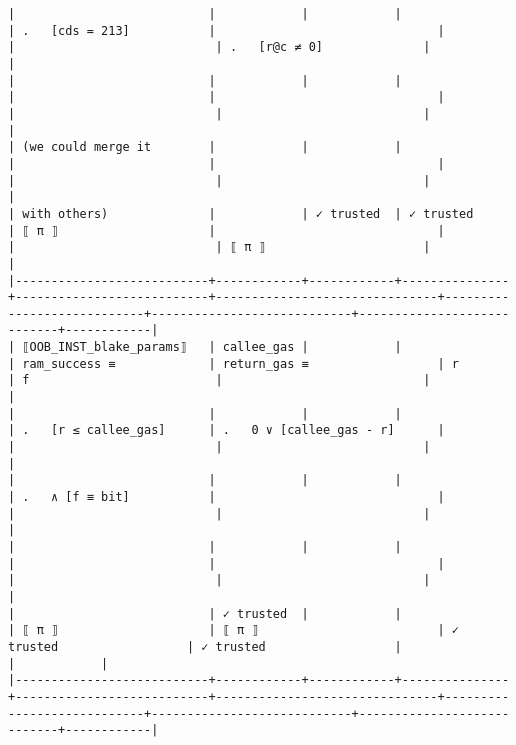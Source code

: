 \documentclass[varwidth=\maxdimen,margin=0.5cm,multi={verbatim}]{standalone}
\begin{document}
\begin{verbatim}
|                           |            |            |               | .   [cds = 213]           |                               |                            |                            | .   [r@c ≠ 0]              |            |
|                           |            |            |               |                           |                               |                            |                            |                            |            |
| (we could merge it        |            |            |               |                           |                               |                            |                            |                            |            |
| with others)              |            | ✓ trusted  | ✓ trusted     | ⟦ π ⟧                     |                               |                            |                            | ⟦ π ⟧                      |            |
|---------------------------+------------+------------+---------------+---------------------------+-------------------------------+----------------------------+----------------------------+----------------------------+------------|
| ⟦OOB_INST_blake_params⟧   | callee_gas |            |               | ram_success ≡             | return_gas ≡                  | r                          | f                          |                            |            |
|                           |            |            |               | .   [r ≤ callee_gas]      | .   0 ∨ [callee_gas - r]      |                            |                            |                            |            |
|                           |            |            |               | .   ∧ [f ≡ bit]           |                               |                            |                            |                            |            |
|                           |            |            |               |                           |                               |                            |                            |                            |            |
|                           | ✓ trusted  |            |               | ⟦ π ⟧                     | ⟦ π ⟧                         | ✓ trusted                  | ✓ trusted                  |                            |            |
|---------------------------+------------+------------+---------------+---------------------------+-------------------------------+----------------------------+----------------------------+----------------------------+------------|


\end{verbatim}
\end{document}
